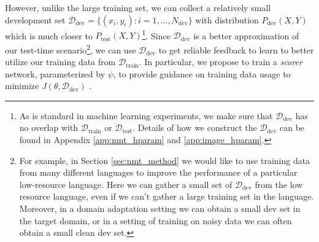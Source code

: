 However, unlike the large training set, we can collect a relatively small development set $\mathcal{D}_\text{dev}= \{(x_i, y_i): i = 1, ..., N_\text{dev}\}$ with distribution $P_{\text{dev}}(X, Y)$ which is much closer to $P_{\text{test}}(X, Y)$\footnote{As is standard in machine learning experiments, we make sure that $\mathcal{D}_\text{dev}$ has no overlap with $\mathcal{D}_\text{train}$ or $\mathcal{D}_\text{test}$. Details of how we construct the $\mathcal{D}_\text{dev}$ can be found in Appendix \ref{app:nmt_hparam} and \ref{app:image_hparam}.}.
Since $\mathcal{D}_\text{dev}$ is a better approximation of our test-time scenario\footnote{For example, in Section \ref{sec:nmt_method} we would like to use training data from many different languages to improve the performance of a particular low-resource language. Here we can gather a small set of $\mathcal{D}_\text{dev}$ from the low resource language, even if we can’t gather a large training set in the language. Moreover, in a domain adaptation setting we can obtain a small dev set in the target domain, or in a setting of training on noisy data we can often obtain a small clean dev set.}, we can use $\mathcal{D}_\text{dev}$ to get reliable feedback to learn to better utilize our training data from $\mathcal{D}_\text{train}$. In particular, we propose to train a \emph{scorer} network, parameterized by $\psi$, to provide guidance on training data usage to minimize $J(\theta, \mathcal{D}_\text{dev})$ .



